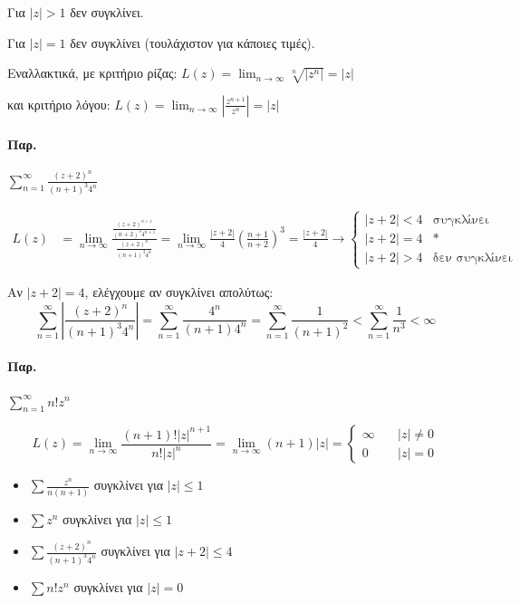 \documentclass[12pt,a4paper,notitlepage,fleqn]{article}
\begin{document}
     Για \( |z|>1 \) δεν συγκλίνει.

     Για \( |z|=1 \) δεν συγκλίνει (τουλάχιστον για κάποιες τιμές).

     Εναλλακτικά, με κριτήριο ρίζας: \( L(z)=\lim_{n\to \infty}
     \sqrt[n]{\left|z^n\right|} = |z|
      \)

     και κριτήριο λόγου: \( L(z) = \lim_{n\to\infty}\left|
     \frac{z^{n+1}}{z^n}\right| =|z| \)


     \paragraph{Παρ.}
     \( \sum_{n=1}^\infty \frac{(z+2)^n}{(n+1)^3 4^n} \)

     \begin{align*}
     L(z) &= \lim_{n\to \infty}\frac{\frac{(z+2)^{n+1}}{(n+2)^3 4^{n+1}}}{
     	\frac{(z+2)^n}{(n+1)^3 4^n}
     	} = \lim_{n\to\infty} \frac{|z+2|}{4}\left(
     	\frac{n+1}{n+2}
     	\right)^3= \frac{|z+2|}{4} \to \begin{cases}
     	|z+2| < 4 & \text{συγκλίνει} \\
     	|z+2| = 4 & * \text{} \\
     	|z+2| > 4 & \text{δεν συγκλίνει}
     	\end{cases}
     \end{align*}

     Αν \( |z+2|= 4 \), ελέγχουμε αν συγκλίνει απολύτως: \[
     \sum_{n=1}^\infty \left| \frac{(z+2)^n}{(n+1)^3 4^n} \right|
     = \sum_{n=1}^\infty \frac{4^n}{(n+1) 4^n} = \sum_{n=1}^\infty
     \frac{1}{(n+1)^2} < \sum_{n=1}^\infty \frac{1}{n^3} < \infty
      \]

   \paragraph{Παρ.} \( \sum_{n=1}^\infty n!z^n \)

   \[
   L(z) = \lim_{n\to \infty} \frac{(n+1)!|z|^{n+1}}{n!|z|^n}
   = \lim_{n\to \infty}(n+1)|z|=\begin{cases}
   \infty \quad & |z| \neq 0 \\
   0 \quad & |z| = 0
   \end{cases}
   \]

  \begin{infobox}{}
     	\begin{itemize}
     		\item
     		\( \displaystyle \sum\frac{z^n}{n(n+1)} \) συγκλίνει για \( |z|\leq 1 \)
     		\item
     		\( \displaystyle \sum z^n \) συγκλίνει για \( |z|\leq 1 \)
     		\item
     		\( \displaystyle \sum \frac{(z+2)^n}{(n+1)^3 4^n} \)
     		συγκλίνει για \( |z+2| \leq 4 \)
     		\item
     		\( \displaystyle \sum n!z^n \) συγκλίνει για \( |z| = 0 \)
     	\end{itemize}
  \end{infobox}
  
\end{document}
